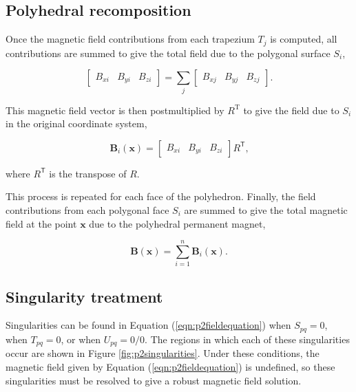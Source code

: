 \subsection{Polyhedral recomposition}

Once the magnetic field contributions from each trapezium \(T_{\!j}\) is computed, all contributions are summed to give the total field due to the polygonal surface \(S_{\!i}\),

\begin{equation}
\begin{bmatrix}
B_{xi} & B_{yi} & B_{zi}
\end{bmatrix} = \sum_j \begin{bmatrix}
B_{xj} & B_{yj} & B_{zj} \end{bmatrix} \text{.}
\end{equation}

\noindent This magnetic field vector is then postmultiplied by \(R^\text{T}\) to give the field due to \(S_{\!i}\) in the original coordinate system,

\begin{equation}
\textbf{B}_i\left(\textbf{x}\right) = \begin{bmatrix}
B_{xi} & B_{yi} & B_{zi} \end{bmatrix}
R^\textsf{T} \text{,}
\end{equation}

\noindent where \(R^{\textsf{T}}\) is the transpose of \(R\).

This process is repeated for each face of the polyhedron. Finally, the field contributions from each polygonal face \(S_{\!i}\) are summed to give the total magnetic field at the point \(\mathbf{x}\) due to the polyhedral permanent magnet,

\begin{equation}
\textbf{B}\left(\textbf{x}\right) = \sum_{i=1}^n \textbf{B}_i\left(\textbf{x}\right) \text{.}
\end{equation}

\subsection{Singularity treatment}

Singularities can be found in Equation (\ref{eqn:p2fieldequation}) when \(S_{\!pq} = 0\), when \(T_{pq} = 0\), or when \(U_{pq} = 0/0\). The regions in which each of these singularities occur are shown in Figure \ref{fig:p2singularities}. Under these conditions, the magnetic field given by Equation (\ref{eqn:p2fieldequation}) is undefined, so these singularities must be resolved to give a robust magnetic field solution.

